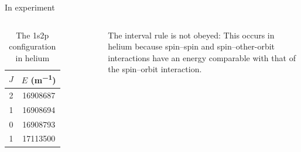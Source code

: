 \begin{frame}{In experiment}
\begin{columns}
{\begin{table}[]
\begin{tabular}{c|c}
                    \hline
                    $J$ & $E$ (\unit{m^{-1}}) \\
                    \hline
                    2 & 16908687 \\
                    1 & 16908694 \\
                    0 & 16908793 \\
                    1 & 17113500 \\
                    \hline
                \end{tabular}
                \caption{The 1s2p configuration in helium}
            \end{table}
            The interval rule is not obeyed: This occurs in helium because spin–spin and spin–other-orbit interactions have an energy comparable with that of the spin–orbit interaction.}
    \end{columns}
\end{frame}